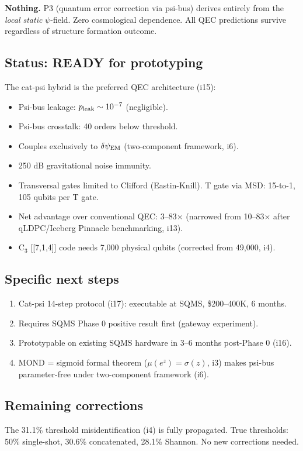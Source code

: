 \documentclass[11pt]{article}
\begin{document}
\textbf{Nothing.} P3 (quantum error correction via psi-bus) derives entirely from
the \emph{local static} $\psi$-field. Zero cosmological dependence. All QEC
predictions survive regardless of structure formation outcome.

\subsection{Status: READY for prototyping}

The cat-psi hybrid is the preferred QEC architecture (i15):
\begin{itemize}
\item Psi-bus leakage: $p_{\rm leak} \sim 10^{-7}$ (negligible).
\item Psi-bus crosstalk: 40 orders below threshold.
\item Couples exclusively to $\delta\psi_{\rm EM}$ (two-component framework, i6).
\item 250 dB gravitational noise immunity.
\item Transversal gates limited to Clifford (Eastin-Knill). T gate via MSD: 15-to-1,
105 qubits per T gate.
\item Net advantage over conventional QEC: 3--83$\times$ (narrowed from 10--83$\times$
after qLDPC/Iceberg Pinnacle benchmarking, i13).
\item C$_3$ [[7,1,4]] code needs 7,000 physical qubits (corrected from 49,000, i4).
\end{itemize}

\subsection{Specific next steps}
\begin{enumerate}
\item Cat-psi 14-step protocol (i17): executable at SQMS, \$200--400K, 6 months.
\item Requires SQMS Phase 0 positive result first (gateway experiment).
\item Prototypable on existing SQMS hardware in 3--6 months post-Phase 0 (i16).
\item MOND = sigmoid formal theorem ($\mu(e^z) = \sigma(z)$, i3) makes psi-bus
parameter-free under two-component framework (i6).
\end{enumerate}

\subsection{Remaining corrections}
The 31.1\% threshold misidentification (i4) is fully propagated. True thresholds:
50\% single-shot, 30.6\% concatenated, 28.1\% Shannon. No new corrections needed.
\end{document}
